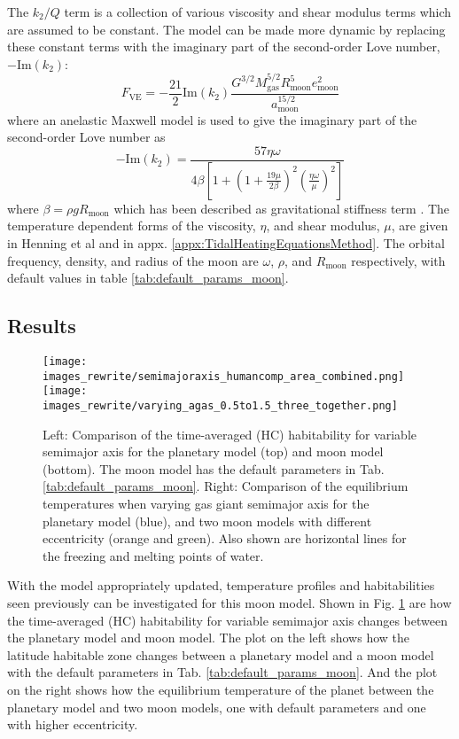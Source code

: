 \documentclass[12pt, onecolumn]{revtex4-2}    %
\begin{document}
The $k_2 / Q$ term is a collection of various viscosity and shear modulus terms which are assumed to be constant.
The model can be made more dynamic by replacing these constant terms with the imaginary part of the second-order Love number, $-\text{Im}(k_2)$:
\begin{equation}
  F_\text{VE} = -\frac{21}{2} \text{Im}(k_2) \frac{G^{3/2} M_\text{gas}^{5/2} R_\text{moon}^5 e_\text{moon}^2} {a_\text{moon}^{15/2}}
\end{equation}
where an anelastic Maxwell model is used to give the imaginary part of the second-order Love number as
\begin{equation}
  -\text{Im}(k_2) = \frac{57 \eta \omega} {4 \beta \left[ 1 
  + \left(1 + \frac{19 \mu}{2 \beta}\right)^2 
  \left(\frac{\eta \omega}{\mu}\right)^2 
  \right]}
\end{equation}
where $\beta = \rho g R_\text{moon}$ which has been described as gravitational stiffness term \cite{Henning2009}.
The temperature dependent forms of the viscosity, $\eta$, and shear modulus, $\mu$, are given in Henning et al \cite{Henning2009} and in appx. \ref{appx:TidalHeatingEquationsMethod}. 
The orbital frequency, density, and radius of the moon are $\omega$, $\rho$, and $R_\text{moon}$ respectively, with default values in table \ref{tab:default_params_moon}.


\cite{DHT2015}
\cite{RN21}

\subsection{Results}
\begin{figure}
  \texttt{[image: images\_rewrite/semimajoraxis\_humancomp\_area\_combined.png]}
  \texttt{[image: images\_rewrite/varying\_agas\_0.5to1.5\_three\_together.png]}
  \caption{
    Left: Comparison of the time-averaged (HC) habitability for variable semimajor axis for the planetary model (top) and moon model (bottom). 
    The moon model has the default parameters in Tab. \ref{tab:default_params_moon}.
    Right: Comparison of the equilibrium temperatures when varying gas giant semimajor axis for the planetary model (blue), and two moon models with different eccentricity (orange and green).
    Also shown are horizontal lines for the freezing and melting points of water.
  }
  \label{fig:semimajoraxiscomparision}
\end{figure}

With the model appropriately updated, temperature profiles and habitabilities seen previously can be investigated for this moon model.
Shown in Fig. \ref{fig:semimajoraxiscomparision} are how the time-averaged (HC) habitability for variable semimajor axis changes between the planetary model and moon model. 
The plot on the left shows how the latitude habitable zone changes between a planetary model and a moon model with the default parameters in Tab. \ref{tab:default_params_moon}.
And the plot on the right shows how the equilibrium temperature of the planet between the planetary model and two moon models, one with default parameters and one with higher eccentricity.
\end{document}
